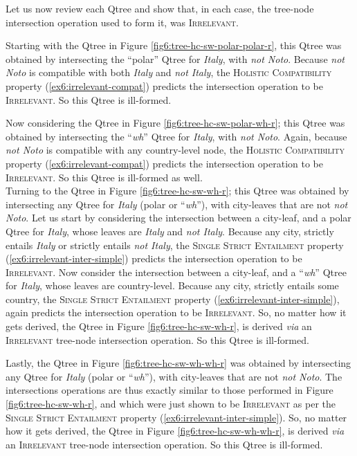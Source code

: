 Let us now review each Qtree and show that, in each case, the tree-node intersection operation used to form it, was \textsc{Irrelevant}.

Starting with the Qtree in Figure \ref{fig6:tree-hc-sw-polar-polar-r}, this Qtree was obtained by intersecting the ``polar'' Qtree for \textit{Italy}, with \textit{not Noto}. Because \textit{not Noto} is compatible with both \textit{Italy} and \textit{not Italy}, the \textsc{Holistic Compatibility} property (\ref{ex6:irrelevant-compat}) predicts the intersection operation to be \textsc{Irrelevant}. So this Qtree is ill-formed.

Now considering the Qtree in Figure \ref{fig6:tree-hc-sw-polar-wh-r}; this Qtree was obtained by intersecting the ``\textit{wh}'' Qtree for \textit{Italy}, with \textit{not Noto}. Again, because \textit{not Noto} is compatible with any country-level node, the \textsc{Holistic Compatibility} property (\ref{ex6:irrelevant-compat}) predicts the intersection operation to be \textsc{Irrelevant}. So this Qtree is ill-formed as well.\\

Turning to the Qtree in Figure \ref{fig6:tree-hc-sw-wh-r}; this Qtree was obtained by intersecting any Qtree for \textit{Italy} (polar or ``\textit{wh}''), with city-leaves that are not \textit{not Noto}. Let us start by considering the intersection between a city-leaf, and a polar Qtree for \textit{Italy}, whose leaves are \textit{Italy} and \textit{not Italy}. Because any city, strictly entails \textit{Italy} or strictly entails \textit{not Italy}, the \textsc{Single Strict Entailment} property (\ref{ex6:irrelevant-inter-simple}) predicts the intersection operation to be \textsc{Irrelevant}. Now consider the intersection between a city-leaf, and a ``\textit{wh}'' Qtree for \textit{Italy}, whose leaves are country-level. Because any city, strictly entails some country, the \textsc{Single Strict Entailment} property (\ref{ex6:irrelevant-inter-simple}), again predicts the intersection operation to be \textsc{Irrelevant}. So, no matter how it gets derived, the Qtree in Figure \ref{fig6:tree-hc-sw-wh-r}, is derived \textit{via} an \textsc{Irrelevant} tree-node intersection operation. So this Qtree is ill-formed.

Lastly, the Qtree in Figure \ref{fig6:tree-hc-sw-wh-wh-r} was obtained by intersecting any Qtree for \textit{Italy} (polar or ``\textit{wh}''), with city-leaves that are not \textit{not Noto}. The intersections operations are thus exactly similar to those performed in Figure \ref{fig6:tree-hc-sw-wh-r}, and which were just shown to be \textsc{Irrelevant} as per the \textsc{Single Strict Entailment} property (\ref{ex6:irrelevant-inter-simple}). So, no matter how it gets derived, the Qtree in Figure \ref{fig6:tree-hc-sw-wh-wh-r}, is derived \textit{via} an \textsc{Irrelevant} tree-node intersection operation. So this Qtree is ill-formed.

